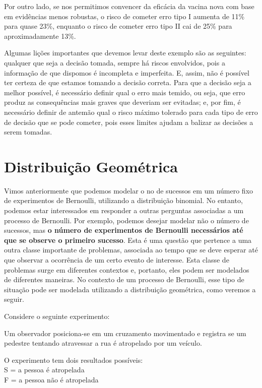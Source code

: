 \documentclass[
]{book}
\theoremstyle{definition}
\theoremstyle{definition}
\theoremstyle{definition}
\theoremstyle{remark}
\begin{document}
Por outro lado, se nos permitimos convencer da eficácia da vacina nova com base em evidências menos robustas, o risco de cometer erro tipo I aumenta de 11\% para quase 23\%, enquanto o risco de cometer erro tipo II cai de 25\% para aproximadamente 13\%.

Algumas lições importantes que devemos levar deste exemplo são as seguintes: qualquer que seja a decisão tomada, sempre há riscos envolvidos, pois a informação de que dispomos é incompleta e imperfeita. E, assim, não é possível ter certeza de que estamos tomando a decisão correta. Para que a decisão seja a melhor possível, é necessário definir qual o erro mais temido, ou seja, que erro produz as consequências mais graves que deveriam ser evitadas; e, por fim, é necessário definir de antemão qual o risco máximo tolerado para cada tipo de erro de decisão que se pode cometer, pois esses limites ajudam a balizar as decisões a serem tomadas.

\hypertarget{distribuiuxe7uxe3o-geomuxe9trica}{%
\section{Distribuição Geométrica}\label{distribuiuxe7uxe3o-geomuxe9trica}}

Vimos anteriormente que podemos modelar o no de sucessos em um número fixo de experimentos de Bernoulli, utilizando a distribuição binomial. No entanto, podemos estar interessados em responder a outras perguntas associadas a um processo de Bernoulli. Por exemplo, podemos desejar modelar não o número de sucessos, mas \textbf{o número de experimentos de Bernoulli necessários até que se observe o primeiro sucesso}. Esta é uma questão que pertence a uma outra classe importante de problemas, associada ao tempo que se deve esperar até que observar a ocorrência de um certo evento de interesse. Esta classe de problemas surge em diferentes contextos e, portanto, eles podem ser modelados de diferentes maneiras. No contexto de um processo de Bernoulli, esse tipo de situação pode ser modelada utilizando a distribuição geométrica, como veremos a seguir.

Considere o seguinte experimento:

Um observador posiciona-se em um cruzamento movimentado e registra se um
pedestre tentando atravessar a rua é atropelado por um veículo.

O experimento tem dois resultados possíveis:\\
S = a pessoa é atropelada\\
F = a pessoa não é atropelada
\end{document}
